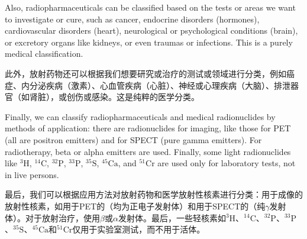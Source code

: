\documentclass[dvipsnames, svgnames,a4paper,11pt]{article}
\begin{document}
Also, radiopharmaceuticals can be classified based on the tests or areas we want to investigate or cure, such as cancer, endocrine disorders (hormones), cardiovascular disorders (heart), neurological or psychological conditions (brain), or excretory organs like kidneys, or even traumas or infections. This is a purely medical classification.

此外，放射药物还可以根据我们想要研究或治疗的测试或领域进行分类，例如癌症、内分泌疾病（激素）、心血管疾病（心脏）、神经或心理疾病（大脑）、排泄器官（如肾脏），或创伤或感染。这是纯粹的医学分类。

Finally, we can classify radiopharmaceuticals and medical radionuclides by methods of application: there are radionuclides for imaging, like those for PET (all are positron emitters) and for SPECT (pure gamma emitters). For radiotherapy, beta or alpha emitters are used. Finally, some light radionuclides like ${}^\text{3}\text{H}$, ${}^\text{14}\text{C}$, ${}^\text{32}\text{P}$, ${}^\text{33}\text{P}$, ${}^\text{35}\text{S}$, ${}^\text{45}\text{Ca}$, and ${}^\text{51}\text{Cr}$ are used only for laboratory tests, not in live persons.

最后，我们可以根据应用方法对放射药物和医学放射性核素进行分类：用于成像的放射性核素，如用于PET的（均为正电子发射体）和用于SPECT的（纯$\gamma$发射体）。对于放射治疗，使用$\beta$或$\alpha$发射体。最后，一些轻核素如${}^\text{3}\text{H}$、${}^\text{14}\text{C}$、${}^\text{32}\text{P}$、${}^\text{33}\text{P}$、${}^\text{35}\text{S}$、${}^\text{45}\text{Ca}$和${}^\text{51}\text{Cr}$仅用于实验室测试，而不用于活体。
\end{document}
